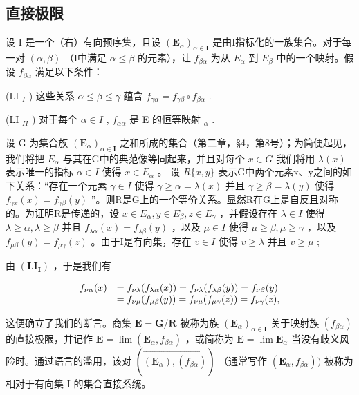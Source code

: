 \subsection{直接极限}

设 I 是一个（右）有向预序集，且设 \((\mathbf{E}_{\alpha})_{\alpha\in\mathbf{I}}\) 是由I指标化的一族集合。对于每一对 \((\alpha,\beta)\) （I中满足 \(\alpha\leqslant\beta\) 的元素），让 \(f_{\beta\alpha}\) 为从 \(E_{\alpha}\) 到 \(E_{\beta}\) 中的一个映射。假设 \(f_{\beta\alpha}\) 满足以下条件：

(LI \(_{I}\) ) 这些关系 \(\alpha \leqslant \beta \leqslant \gamma\) 蕴含 \(f_{\gamma\alpha} = f_{\gamma\beta} \circ f_{\beta\alpha}\) .

(LI \(_{II}\) ) 对于每个 \(\alpha \in I\) , \(f_{\alpha\alpha}\) 是 E 的恒等映射 \(_{\alpha}\) .

设 G 为集合族 \((\mathbf{E}_{\alpha})_{\alpha\in\mathbf{I}}\) 之和所成的集合（第二章，§4，第8号）；为简便起见，我们将把 \(E_{\alpha}\) 与其在G中的典范像等同起来，并且对每个 \(x\in G\) 我们将用 \(\lambda(x)\) 表示唯一的指标 \(\alpha\in I\) 使得 \(x\in E_{\alpha}\) 。 设 \(R\{x,y\}\) 表示G中两个元素x、y之间的如下关系：“存在一个元素 \(\gamma\in I\) 使得 \(\gamma\geqslant\alpha=\lambda(x)\) 并且 \(\gamma\geqslant\beta=\lambda(y)\) 使得 \(f_{\gamma x}(x)=f_{\gamma\beta}(y)\) ”。则R是G上的一个等价关系。显然R在G上是自反且对称的。为证明R是传递的，设 \(x\in E_{\alpha}, y\in E_{\beta}, z\in E_{\gamma}\) ，并假设存在 \(\lambda\in I\) 使得 \(\lambda\geqslant\alpha,\lambda\geqslant\beta\) 并且 \(f_{\lambda\alpha}(x)=f_{\lambda\beta}(y)\) ，以及 \(\mu\in I\) 使得 \(\mu\geqslant\beta,\mu\geqslant\gamma\) ，以及 \(f_{\mu\beta}(y)=f_{\mu\gamma}(z)\) 。由于I是有向集，存在 \(v\in I\) 使得 \(v\geqslant\lambda\) 并且 \(v\geqslant\mu\) ;

由 \((\mathbf{LI}_{\mathbf{I}})\) ，于是我们有

\[
\begin{array}{r l} f _ {\nu \alpha} (x) & = f _ {\nu \lambda} (f _ {\lambda \alpha} (x)) = f _ {\nu \lambda} (f _ {\lambda \beta} (y)) = f _ {\nu \beta} (y) \\ & = f _ {\nu \mu} (f _ {\mu \beta} (y)) = f _ {\nu \mu} (f _ {\mu \gamma} (z)) = f _ {\nu \gamma} (z), \end{array}
\]

这便确立了我们的断言。商集 \(\mathbf{E} = \mathbf{G} / \mathbf{R}\) 被称为族 \((\mathbf{E}_{\alpha})_{\alpha \in \mathbf{I}}\) 关于映射族 \((f_{\beta \alpha})\) 的直接极限，并记作 \(\mathbf{E} = \lim (\mathbf{E}_{\alpha}, f_{\beta \alpha})\) ，或简称为 \(\mathbf{E} = \lim \mathbf{E}_{\alpha}\) 当没有歧义风险时。通过语言的滥用，该对 \((\overrightarrow{(\mathbf{E}_{\alpha}), (f_{\beta \alpha})})\) （通常写作 \((\mathbf{E}_{\alpha}, f_{\beta \alpha}))\) 被称为相对于有向集 I 的集合直接系统。

